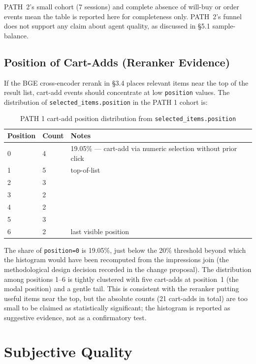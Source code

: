 PATH~2's small cohort (7 sessions) and complete absence of will-buy or order events mean the table is reported here for completeness only. PATH~2's funnel does not support any claim about agent quality, as discussed in §5.1 sample-balance.

\subsection{Position of Cart-Adds (Reranker Evidence)}
\label{subsec:position_histogram}

If the BGE cross-encoder rerank in §3.4 places relevant items near the top of the result list, cart-add events should concentrate at low \texttt{position} values. The distribution of \texttt{selected\_items.position} in the PATH 1 cohort is:

\begin{table}[H]
\centering
\begin{tabular}{p{2cm}p{2cm}p{8cm}}
\toprule
\textbf{Position} & \textbf{Count} & \textbf{Notes}\\
\midrule
0 & 4  & 19.05\% --- cart-add via numeric selection without prior click\\
1 & 5  & top-of-list\\
2 & 3 & \\
3 & 2 & \\
4 & 2 & \\
5 & 3 & \\
6 & 2 & last visible position\\
\bottomrule
\end{tabular}
\caption{PATH 1 cart-add position distribution from \texttt{selected\_items.position}}
\label{tab:position_histogram}
\end{table}

The share of \texttt{position=0} is 19.05\%, just below the 20\% threshold beyond which the histogram would have been recomputed from the impressions join (the methodological design decision recorded in the change proposal). The distribution among positions 1--6 is tightly clustered with five cart-adds at position~1 (the modal position) and a gentle tail. This is consistent with the reranker putting useful items near the top, but the absolute counts (21 cart-adds in total) are too small to be claimed as statistically significant; the histogram is reported as suggestive evidence, not as a confirmatory test.


\section{Subjective Quality}
\label{sec:subjective_quality}

